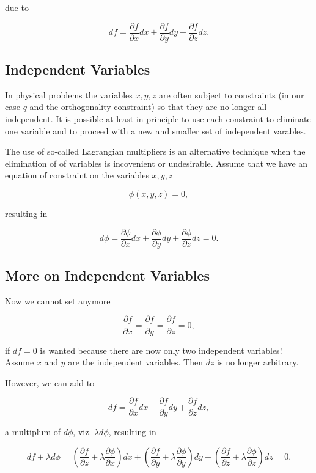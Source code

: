 \documentclass[%
oneside,                 %
final,                   %
10pt]{article}
\begin{document}
due to

\[
df = \frac{\partial f}{\partial x}dx+\frac{\partial f}{\partial y}dy+\frac{\partial f}{\partial z}dz.
\]

\subsection{Independent Variables}

In physical problems the variables $x,y,z$ are often subject to constraints (in our case $q$ and the orthogonality constraint)
so that they are no longer all independent. It is possible at least in principle to use each constraint to eliminate one variable
and to proceed with a new and smaller set of independent varables.

The use of so-called Lagrangian  multipliers is an alternative technique  when the elimination of
of variables is incovenient or undesirable.  Assume that we have an equation of constraint on the variables $x,y,z$

\[
\phi(x,y,z) = 0,
\]

 resulting in

\[
d\phi = \frac{\partial \phi}{\partial x}dx+\frac{\partial \phi}{\partial y}dy+\frac{\partial \phi}{\partial z}dz =0.
\]

\subsection{More on Independent Variables}

Now we cannot set anymore

\[
\frac{\partial f}{\partial x} =\frac{\partial f}{\partial y}=\frac{\partial f}{\partial z}=0,
\]

if $df=0$ is wanted
because there are now only two independent variables!  Assume $x$ and $y$ are the independent variables.
Then $dz$ is no longer arbitrary.

However, we can add to

\[
df = \frac{\partial f}{\partial x}dx+\frac{\partial f}{\partial y}dy+\frac{\partial f}{\partial z}dz,
\]

a multiplum of $d\phi$, viz. $\lambda d\phi$, resulting  in

\[
df+\lambda d\phi = (\frac{\partial f}{\partial z}+\lambda\frac{\partial \phi}{\partial x})dx+(\frac{\partial f}{\partial y}+\lambda\frac{\partial \phi}{\partial y})dy+(\frac{\partial f}{\partial z}+\lambda\frac{\partial \phi}{\partial z})dz =0.
\]
\end{document}
